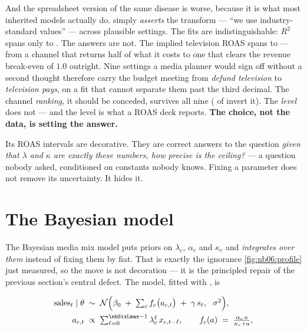 

And the spreadsheet version of the same disease is worse, because it is what most inherited models
actually do.  simply \emph{asserts} the transform --- ``we use
industry-standard values'' --- across \nbSixAssertN{} plausible settings. The fits are
indistinguishable: $R^2$ spans only \nbSixAssertRsqLo{} to \nbSixAssertRsqHi. The answers are not.
The implied television ROAS spans \nbSixAssertRoasTvLo{} to \nbSixAssertRoasTvHi --- from a channel
that returns half of what it costs to one that clears the revenue break-even of $1.0$ outright. Nine
settings a media planner would sign off without a second thought therefore carry the budget meeting
from \emph{defund television} to \emph{television pays}, on a fit that cannot separate them past the
third decimal. The channel \emph{ranking}, it should be conceded, survives all nine
(\nbSixAssertNInverted{} of \nbSixAssertN{} invert it). The \emph{level} does not --- and the level
is what a ROAS deck reports. \textbf{The choice, not the data, is setting the answer.}

\begin{remark}
Its ROAS intervals are decorative. They are correct answers to the question \emph{given that
$\lambda$ and $\kappa$ are exactly these numbers, how precise is the ceiling?} --- a question
nobody asked, conditioned on constants nobody knows. Fixing a parameter does not remove its
uncertainty. It hides it.
\end{remark}

\section{The Bayesian model}
\label{sec:mmm:bayes}

The Bayesian media mix model \citep{jin2017} puts priors on $\lambda_c$, $\alpha_c$ and $\kappa_c$
and \emph{integrates over them} instead of fixing them by fiat. That is exactly the ignorance
\cref{fig:nb06:profile} just measured, so the move is not decoration --- it is the principled
repair of the previous section's central defect. The model, fitted with
, is

\begin{align}
  \text{sales}_t \mid \theta
    &\;\sim\; \mathcal N\Big(\beta_0 \;+\; \textstyle\sum_c f_c\big(a_{c,t}\big)
                             \;+\; \gamma\, s_t,\ \ \sigma^2\Big),
      \label{eq:mmm:lik}\\
  a_{c,t} &\;\propto\; \textstyle\sum_{\ell=0}^{\nbSixLmax - 1} \lambda_c^{\ell}\, x_{c,t-\ell},
  \qquad
  f_c(a) \;=\; \frac{\alpha_c\, a}{\kappa_c + a},
      \label{eq:mmm:transforms}
\end{align}

